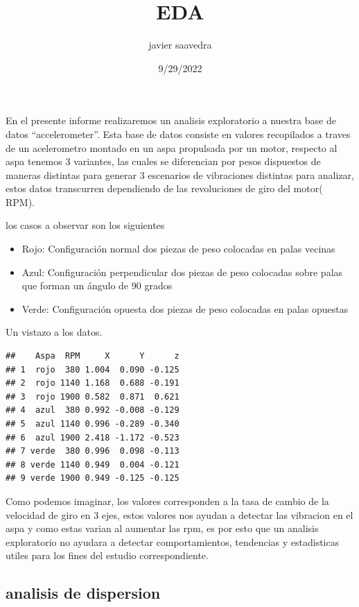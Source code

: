 \documentclass[
]{article}
\title{EDA}
\author{javier saavedra}
\date{9/29/2022}
\begin{document}
\maketitle

En el presente informe realizaremos un analisis exploratorio a nuestra
base de datos ``accelerometer''. Esta base de datos consiste en valores
recopilados a traves de un acelerometro montado en un aspa propulsada
por un motor, respecto al aspa tenemos 3 variantes, las cuales se
diferencian por pesos dispuestos de maneras distintas para generar 3
escenarios de vibraciones distintas para analizar, estos datos
transcurren dependiendo de las revoluciones de giro del motor( RPM).

los casos a observar son los siguientes

\begin{itemize}
\item Rojo: Configuración normal dos piezas de peso colocadas en palas vecinas
\item Azul: Configuración perpendicular dos piezas de peso colocadas sobre palas que forman un ángulo de 90 grados
\item Verde: Configuración opuesta dos piezas de peso colocadas en palas opuestas
\end{itemize}

Un vistazo a los datos.

\begin{verbatim}
##    Aspa  RPM     X      Y      z
## 1  rojo  380 1.004  0.090 -0.125
## 2  rojo 1140 1.168  0.688 -0.191
## 3  rojo 1900 0.582  0.871  0.621
## 4  azul  380 0.992 -0.008 -0.129
## 5  azul 1140 0.996 -0.289 -0.340
## 6  azul 1900 2.418 -1.172 -0.523
## 7 verde  380 0.996  0.098 -0.113
## 8 verde 1140 0.949  0.004 -0.121
## 9 verde 1900 0.949 -0.125 -0.125
\end{verbatim}

Como podemos imaginar, los valores corresponden a la tasa de cambio de
la velocidad de giro en 3 ejes, estos valores nos ayudan a detectar las
vibracion en el aspa y como estas varian al aumentar las rpm, es por
esto que un analisis exploratorio no ayudara a detectar comportamientos,
tendencias y estadisticas utiles para los fines del estudio
correspondiente. \newpage

\hypertarget{analisis-de-dispersion}{%
\subsection{analisis de dispersion}\label{analisis-de-dispersion}}
\end{document}
